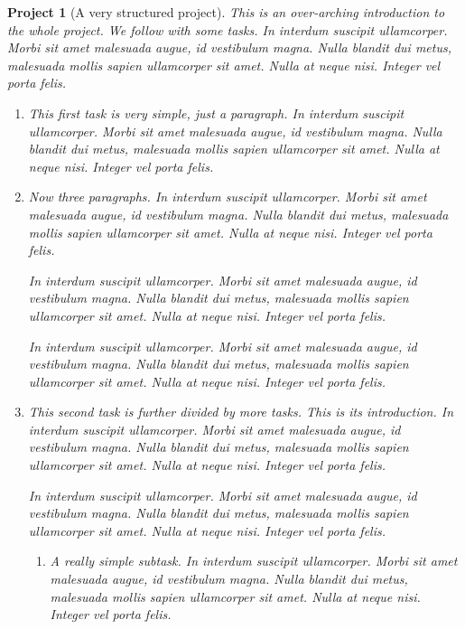 \documentclass{sn-jnl}
\theoremstyle{thmstyleone}%
\theoremstyle{thmstyletwo}%
\newtheorem{project}[theorem]{Project}
\theoremstyle{thmstylethree}%
\numberwithin{equation}{section}
\begin{document}
\begin{project}[A very structured project]\label{project-structured}%
%
This is an over-arching introduction to the whole project.  We follow with some tasks.  In interdum suscipit ullamcorper. Morbi sit amet malesuada augue, id vestibulum magna. Nulla blandit dui metus, malesuada mollis sapien ullamcorper sit amet. Nulla at neque nisi. Integer vel porta felis.%
\begin{enumerate}[font=\bfseries,label=(\alph*),ref=\alph*]%
\item{}This first task is very simple, just a paragraph.  In interdum suscipit ullamcorper. Morbi sit amet malesuada augue, id vestibulum magna. Nulla blandit dui metus, malesuada mollis sapien ullamcorper sit amet. Nulla at neque nisi. Integer vel porta felis.%
\item{}Now three paragraphs.  In interdum suscipit ullamcorper. Morbi sit amet malesuada augue, id vestibulum magna. Nulla blandit dui metus, malesuada mollis sapien ullamcorper sit amet. Nulla at neque nisi. Integer vel porta felis.%
\par
In interdum suscipit ullamcorper. Morbi sit amet malesuada augue, id vestibulum magna. Nulla blandit dui metus, malesuada mollis sapien ullamcorper sit amet. Nulla at neque nisi. Integer vel porta felis.%
\par
In interdum suscipit ullamcorper. Morbi sit amet malesuada augue, id vestibulum magna. Nulla blandit dui metus, malesuada mollis sapien ullamcorper sit amet. Nulla at neque nisi. Integer vel porta felis.%
\item{}This second task is further divided by more tasks.  This is its introduction.  In interdum suscipit ullamcorper. Morbi sit amet malesuada augue, id vestibulum magna. Nulla blandit dui metus, malesuada mollis sapien ullamcorper sit amet. Nulla at neque nisi. Integer vel porta felis.%
\par
In interdum suscipit ullamcorper. Morbi sit amet malesuada augue, id vestibulum magna. Nulla blandit dui metus, malesuada mollis sapien ullamcorper sit amet. Nulla at neque nisi. Integer vel porta felis.%
\begin{enumerate}[font=\bfseries,label=(\roman*),ref=\theenumi.\roman*]%
\item{}A really simple subtask.  In interdum suscipit ullamcorper. Morbi sit amet malesuada augue, id vestibulum magna. Nulla blandit dui metus, malesuada mollis sapien ullamcorper sit amet. Nulla at neque nisi. Integer vel porta felis.%
\par

\end{enumerate}
\end{enumerate}
\end{project}
\end{document}
